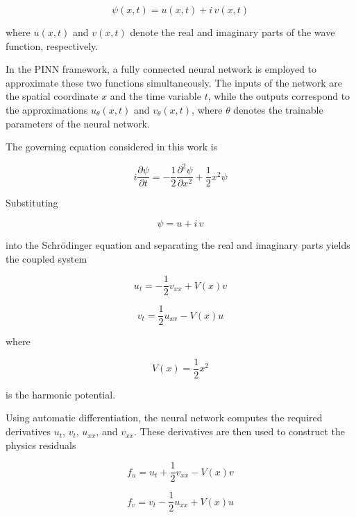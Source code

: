 \documentclass[11pt]{article}
\begin{document}
\begin{equation}
\psi(x,t)=u(x,t)+i\,v(x,t)
\end{equation}

where $u(x,t)$ and $v(x,t)$ denote the real and imaginary parts of the wave function, respectively.

In the PINN framework, a fully connected neural network is employed to approximate these two functions simultaneously. The inputs of the network are the spatial coordinate $x$ and the time variable $t$, while the outputs correspond to the approximations $u_\theta(x,t)$ and $v_\theta(x,t)$, where $\theta$ denotes the trainable parameters of the neural network.

The governing equation considered in this work is

\begin{equation}
i\frac{\partial \psi}{\partial t}
=
-\frac{1}{2}\frac{\partial^2\psi}{\partial x^2}
+
\frac{1}{2}x^2\psi
\label{eq:schrodinger}
\end{equation}

Substituting

\begin{equation}
\psi=u+i\,v
\end{equation}

into the Schrödinger equation and separating the real and imaginary parts yields the coupled system

\begin{equation}
u_t
=
-\frac{1}{2}v_{xx}
+
V(x)v
\end{equation}

\begin{equation}
v_t
=
\frac{1}{2}u_{xx}
-
V(x)u
\end{equation}

where

\begin{equation}
V(x)=\frac{1}{2}x^2
\end{equation}

is the harmonic potential.

Using automatic differentiation, the neural network computes the required derivatives $u_t$, $v_t$, $u_{xx}$, and $v_{xx}$. These derivatives are then used to construct the physics residuals

\begin{equation}
f_u
=
u_t
+
\frac{1}{2}v_{xx}
-
V(x)v
\end{equation}

\begin{equation}
f_v
=
v_t
-
\frac{1}{2}u_{xx}
+
V(x)u
\end{equation}
\end{document}
